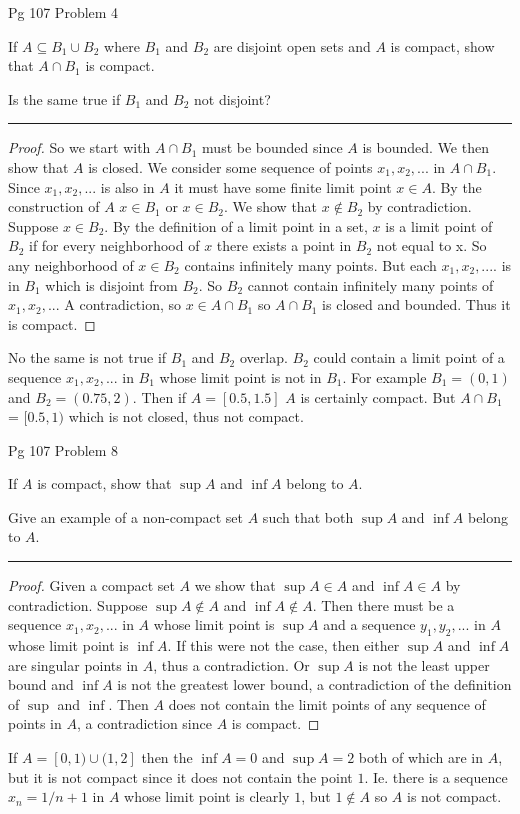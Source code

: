 \documentclass[11pt]{article}
\begin{document}
\newpage
{} Pg 107 Problem 4

If $A \subseteq B_1 \cup B_2$ where $B_1$ and $B_2$ are disjoint open sets and $A$ is compact, show that $A \cap B_1$ is compact. 

Is the same true if $B_1$ and $B_2$ not disjoint?

\hrule

\begin{proof}

So we start with $A \cap B_1$ must be bounded since $A$ is bounded. We then show that $A$ is closed. We consider some sequence of points $x_1, x_2, ...$ in $A \cap B_1$. Since $x_1, x_2, ...$ is also in $A$ it must have some finite limit point $x \in A$. By the construction of $A$ $x \in B_1$ or $x \in B_2$. 
We show that $x \notin B_2$ by contradiction. Suppose $x \in B_2$. By the definition of a limit point in a set, $x$ is a limit point of $B_2$ if for every neighborhood of $x$ there exists a point in $B_2$ not equal to x. So any neighborhood of $x \in B_2$ contains infinitely many points. 
But each $x_1, x_2, ....$ is in $B_1$ which is disjoint from $B_2$. So $B_2$ cannot contain infinitely many points of $x_1, x_2,...$ A contradiction, so $x \in A \cap B_1$ so $A \cap B_1$ is closed and bounded. Thus it is compact.

\end{proof}

No the same is not true if $B_1$ and $B_2$ overlap. $B_2$ could contain a limit point of a sequence $x_1, x_2,...$ in $B_1$ whose limit point is not in $B_1$. For example $B_1 = (0,1)$ and $B_2 = (0.75, 2)$. Then if $A = [0.5, 1.5]$ $A$ is certainly compact. But $A \cap B_1$ = $[0.5, 1)$ which is not closed, thus not compact.


\newpage
{} Pg 107 Problem 8

If $A$ is compact, show that $\sup A$ and $\inf A$ belong to $A$. 

Give an example of a non-compact set $A$ such that both $\sup A$ and $\inf A$ belong to $A$.

\hrule


\begin{proof}

Given a compact set $A$ we show that $\sup A \in A$ and $\inf A \in A$ by contradiction. 
Suppose $\sup A \notin A$ and $\inf A \notin A$. Then there must be a sequence $x_1, x_2, ...$ in $A$ whose limit point is $\sup A$ and a sequence $y_1, y_2, ...$ in $A$ whose limit point is $\inf A$.
If this were not the case, then either $\sup A$ and $\inf A$ are singular points in $A$, thus a contradiction. Or $\sup A$ is not the least upper bound and $\inf A$ is not the greatest lower bound, a contradiction of the definition of $\sup$ and $\inf$.
 Then $A$ does not contain the limit points of any sequence of points in $A$, a contradiction since $A$ is compact. 
\end{proof}

If $A = [0, 1) \cup (1, 2]$ then the $\inf A = 0$ and $\sup A = 2$ both of which are in $A$, but it is not compact since it does not contain the point $1$. Ie. there is a sequence $x_n = 1/n + 1$ in $A$ whose limit point is clearly $1$, but $1 \notin A$ so $A$ is not compact.
\end{document}

